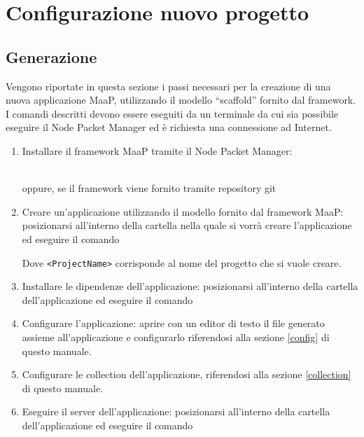 \section{Configurazione nuovo progetto}

\subsection{Generazione}

Vengono riportate in questa sezione i passi necessari per la creazione di una nuova applicazione MaaP, utilizzando il modello ``scaffold'' fornito dal framework. I comandi descritti devono essere eseguiti da un terminale da cui sia possibile eseguire il Node Packet Manager ed è richiesta una connessione ad Internet.

\begin{enumerate}
 \item Installare il framework MaaP tramite il Node Packet Manager: \\
 \centerline{  } \\
 oppure, se il framework viene fornito tramite repository git \\
 \centerline{  }

 \item Creare un'applicazione utilizzando il modello fornito dal framework MaaP: posizionarsi all'interno della cartella nella quale si vorrà creare l'applicazione ed eseguire il comando \\
 \centerline{  }
 Dove \texttt{<ProjectName>} corrisponde al nome del progetto che si vuole creare.

 \item Installare le dipendenze dell'applicazione: posizionarsi all'interno della cartella dell'applicazione ed eseguire il comando \\
 \centerline{  }

 \item Configurare l'applicazione: aprire con un editor di testo il file  generato assieme all'applicazione e configurarlo riferendosi alla sezione \ref{config} di questo manuale.\\

 \item Configurare le collection dell'applicazione, riferendosi alla sezione \ref{collection} di questo manuale.\\

 \item Eseguire il server dell'applicazione: posizionarsi all'interno della cartella dell'applicazione ed eseguire il comando \\
 \centerline{  }
\end{enumerate}

